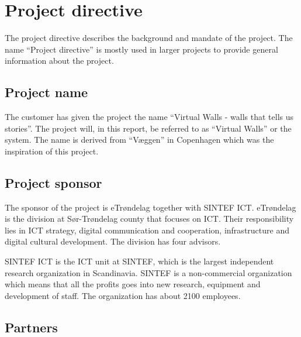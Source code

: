 \documentclass[11pt]{book}
\begin{document}
\section{Project directive}
The project directive describes the background and mandate of the project. The name ``Project directive'' is mostly used in larger projects to provide general information about the project.

\subsection{Project name}
The customer has given the project the name ``Virtual Walls - walls that tells us stories''. The project will, in this report, be referred to as ``Virtual Walls'' or the system. The name is derived from ``Væggen'' in Copenhagen which was the inspiration of this project.

\subsection{Project sponsor}
The sponsor of the project is eTrøndelag together with SINTEF ICT.
eTrøndelag is the division at Sør-Trøndelag county that focuses on ICT. Their responsibility lies in ICT strategy, digital communication and cooperation, infrastructure and digital cultural development. The division has four advisors.

SINTEF ICT is the ICT unit at SINTEF, which is the largest independent research organization in Scandinavia. SINTEF is a non-commercial organization which means that all the profits goes into new research, equipment and development of staff. The organization has about 2100 employees.

\subsection{Partners}
\end{document}
